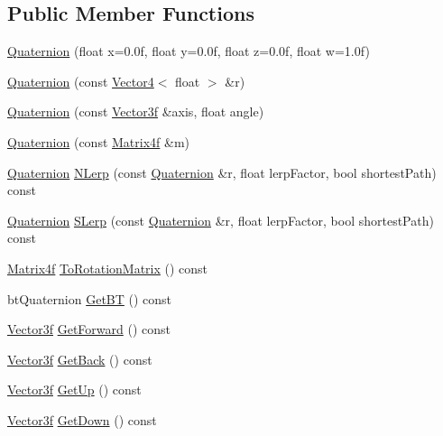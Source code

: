 \subsection*{Public Member Functions}
\begin{DoxyCompactItemize}
\item 
\hyperlink{class_quaternion_a3206d7879f2446e1e7722d5d443f9a34}{Quaternion} (float x=0.\+0f, float y=0.\+0f, float z=0.\+0f, float w=1.\+0f)
\item 
\hyperlink{class_quaternion_afcc45f2a528b5b22dbd650566924c3a6}{Quaternion} (const \hyperlink{class_vector4}{Vector4}$<$ float $>$ \&r)
\item 
\hyperlink{class_quaternion_a45c7466afad2a6ab7b27d3199332bf26}{Quaternion} (const \hyperlink{class_vector3f}{Vector3f} \&axis, float angle)
\item 
\hyperlink{class_quaternion_abbc3809120e7f0d3ef7e4ac7f1ef45cd}{Quaternion} (const \hyperlink{math3d_8h_a5b7721ab7216c91a40538beaa9e6ee1f}{Matrix4f} \&m)
\item 
\hyperlink{class_quaternion}{Quaternion} \hyperlink{class_quaternion_ad01607c48ca84db58804369317ec2df4}{N\+Lerp} (const \hyperlink{class_quaternion}{Quaternion} \&r, float lerp\+Factor, bool shortest\+Path) const 
\item 
\hyperlink{class_quaternion}{Quaternion} \hyperlink{class_quaternion_a84b8812c677f8c3e6112977e3c763f32}{S\+Lerp} (const \hyperlink{class_quaternion}{Quaternion} \&r, float lerp\+Factor, bool shortest\+Path) const 
\item 
\hyperlink{math3d_8h_a5b7721ab7216c91a40538beaa9e6ee1f}{Matrix4f} \hyperlink{class_quaternion_aa5d6a6752bb54dffe8eba74d4828313e}{To\+Rotation\+Matrix} () const 
\item 
bt\+Quaternion \hyperlink{class_quaternion_a933a2ca26bf9794299bad74a4c6d6841}{Get\+B\+T} () const 
\item 
\hyperlink{class_vector3f}{Vector3f} \hyperlink{class_quaternion_affda2740ce48497e8774640fa7121a78}{Get\+Forward} () const 
\item 
\hyperlink{class_vector3f}{Vector3f} \hyperlink{class_quaternion_a3a3c05d15a7fe1247de0eaff29c6152a}{Get\+Back} () const 
\item 
\hyperlink{class_vector3f}{Vector3f} \hyperlink{class_quaternion_ad46bcac60f877d93dc988f4791d934eb}{Get\+Up} () const 
\item 
\hyperlink{class_vector3f}{Vector3f} \hyperlink{class_quaternion_a98620ca1d2b938e6dfd9277ef6b33af6}{Get\+Down} () const 
\item 

\end{DoxyCompactItemize}
